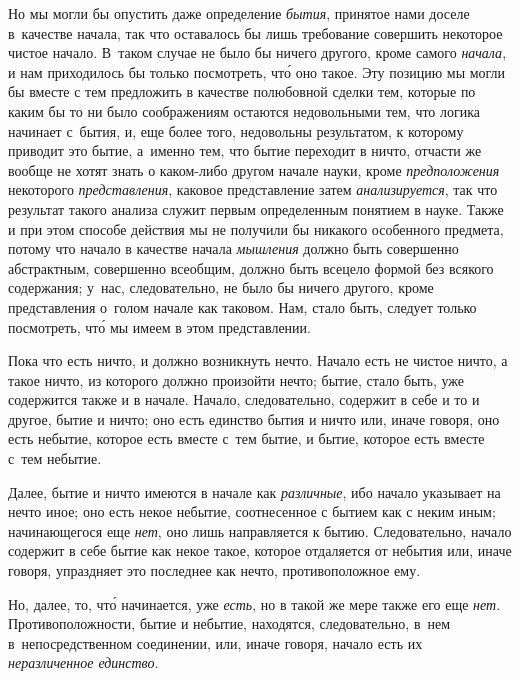 Но мы могли бы опустить даже определение {\em бытия}, принятое нами доселе
в~качестве начала, так что оставалось бы лишь требование совершить некоторое
чистое начало. В~таком случае не было бы ничего другого, кроме самого
{\em начала}, и нам приходилось бы только посмотреть, чт\'{о} оно такое. Эту
позицию мы могли бы вместе с тем предложить в качестве полюбовной сделки тем,
которые по каким бы то ни было соображениям остаются недовольными тем, что
логика начинает с~бытия, и, еще более того, недовольны результатом, к которому
приводит это бытие, а~именно тем, что бытие переходит в ничто, отчасти же
вообще не хотят знать о каком-либо другом начале науки, кроме
{\em предположения} некоторого {\em представления}, каковое представление затем
{\em анализируется}, так что результат такого анализа служит первым
определенным понятием в науке. Также и при этом способе действия мы не получили
бы никакого особенного предмета, потому что начало в качестве начала
{\em мышления} должно быть совершенно абстрактным, совершенно всеобщим, должно
быть всецело формой без всякого содержания; у~нас, следовательно, не было бы
ничего другого, кроме представления о~голом начале как таковом. Нам, стало
быть, следует только посмотреть, чт\'{о} мы имеем в этом представлении.

Пока что есть ничто, и должно возникнуть нечто. Начало есть не чистое ничто,
а такое ничто, из которого должно произойти нечто; бытие, стало быть, уже
содержится также и в начале. Начало, следовательно, содержит в себе и то и
другое, бытие и ничто; оно есть единство бытия и ничто или, иначе говоря,
оно есть небытие, которое есть вместе с~тем бытие, и бытие, которое есть
вместе с~тем небытие.

Далее, бытие и ничто имеются в начале как {\em различные}, ибо начало указывает
на нечто иное; оно есть некое небытие, соотнесенное с бытием как с неким иным;
начинающегося еще {\em нет}, оно лишь направляется к бытию. Следовательно,
начало содержит в себе бытие как некое такое, которое отдаляется от небытия
или, иначе говоря, упраздняет это последнее как нечто, противоположное ему.

Но, далее, то, чт\'{о} начинается, уже {\em есть}, но в такой же мере также его
еще {\em нет}. Противоположности, бытие и небытие, находятся, следовательно,
в~нем в~непосредственном соединении, или, иначе говоря, начало есть их
{\em неразличенное единство}.

